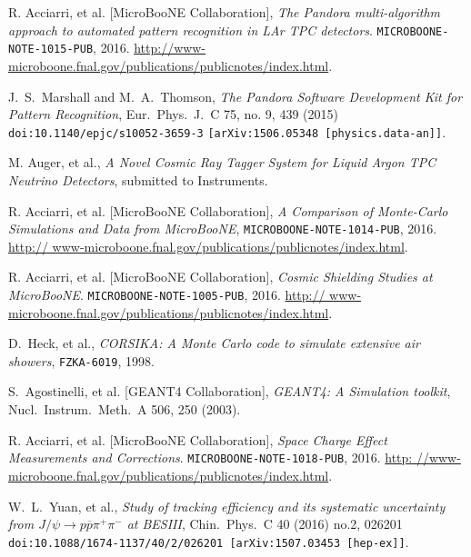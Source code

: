 \documentclass[a4paper]{scrartcl}
\begin{document}
\clearpage{}

\begin{thebibliography}{9}

   R. Acciarri, et al. [MicroBooNE Collaboration], \textit{The Pandora multi-algorithm approach to automated pattern recognition in LAr TPC detectors}. \texttt{MICROBOONE- NOTE-1015-PUB}, 2016. \url{http://www-microboone.fnal.gov/publications/publicnotes/index.html}.

   J.~S.~Marshall and M.~A.~Thomson, \textit{The Pandora Software Development Kit for Pattern Recognition}, Eur.\ Phys.\ J.\ C 75, no. 9, 439 (2015) \texttt{doi:10.1140/epjc/s10052-3659-3} \texttt{[arXiv:1506.05348 [physics.data-an]]}.

   M. Auger, et al., \textit{A Novel Cosmic Ray Tagger System for Liquid Argon TPC Neutrino Detectors}, submitted to Instruments.

   R. Acciarri, et al. [MicroBooNE Collaboration], \textit{A Comparison of Monte-Carlo Simulations and Data from MicroBooNE}, \texttt{MICROBOONE-NOTE-1014-PUB}, 2016. \url{http:// www-microboone.fnal.gov/publications/publicnotes/index.html}.

   R. Acciarri, et al. [MicroBooNE Collaboration], \textit{Cosmic Shielding Studies at MicroBooNE}. \texttt{MICROBOONE-NOTE-1005-PUB}, 2016. \url{http:// www-microboone.fnal.gov/publications/publicnotes/index.html}.

   D.~Heck, et al.,
  \textit{CORSIKA: A Monte Carlo code to simulate extensive air showers},
  \texttt{FZKA-6019}, 1998.

   S.~Agostinelli, et al. [GEANT4 Collaboration], \textit{GEANT4: A Simulation toolkit}, Nucl.\ Instrum.\ Meth.\ A {506}, 250 (2003).

   R. Acciarri, et al. [MicroBooNE Collaboration], \textit{Space Charge Effect Measurements and Corrections}. \texttt{MICROBOONE-NOTE-1018-PUB}, 2016. \url{http: //www-microboone.fnal.gov/publications/publicnotes/index.html}.

    W.~L.~Yuan, et al.,
    \textit{Study of tracking efficiency and its systematic uncertainty from $J/\psi \to p \overline{p} \pi^+ \pi^-$ at BESIII}, Chin.\ Phys.\ C 40 (2016) no.2,  026201 \texttt{doi:10.1088/1674-1137/40/2/026201 [arXiv:1507.03453 [hep-ex]]}.


\end{thebibliography}
\end{document}
